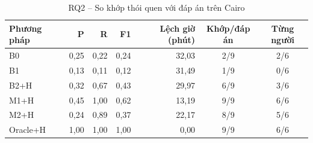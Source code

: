 \begin{table}[htbp]
\centering
\caption{RQ2 -- So khớp thói quen với đáp án trên Cairo}
\label{tab:rq2-cairo}
\small
\begin{tabular}{lrrrrcc}
\toprule
Phương pháp & P & R & F1 & Lệch giờ (phút) & Khớp/đáp án & Từng người \\
\midrule
B0 & 0{,}25 & 0{,}22 & 0{,}24 & 32{,}03 & 2/9 & 2/6 \\
B1 & 0{,}13 & 0{,}11 & 0{,}12 & 31{,}49 & 1/9 & 0/6 \\
B2+H & 0{,}32 & 0{,}67 & 0{,}43 & 29{,}97 & 6/9 & 3/6 \\
M1+H & 0{,}45 & 1{,}00 & 0{,}62 & 13{,}19 & 9/9 & 6/6 \\
M2+H & 0{,}24 & 0{,}89 & 0{,}37 & 22{,}17 & 8/9 & 5/6 \\
Oracle+H & 1{,}00 & 1{,}00 & 1{,}00 & 0{,}00 & 9/9 & 6/6 \\
\bottomrule
\end{tabular}
\end{table}
